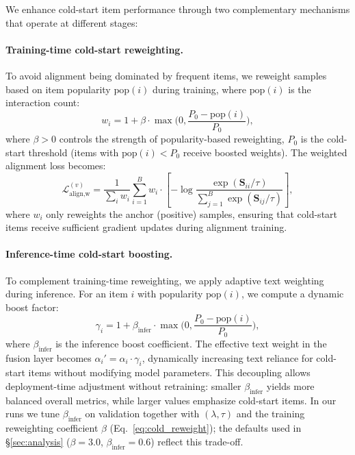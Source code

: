 \documentclass[sigconf,natbib=true,anonymous]{acmart}
\begin{document}
We enhance cold-start item performance through two complementary
mechanisms that operate at different stages:

\paragraph{Training-time cold-start reweighting.}
To avoid alignment being dominated by frequent items, we
reweight samples based on item popularity $\mathrm{pop}(i)$
during training, where $\mathrm{pop}(i)$ is the interaction count:
\begin{equation}
  w_i = 1 + \beta\cdot \max\Big(0, \frac{P_0-\mathrm{pop}(i)}{P_0}\Big),
  \label{eq:cold_reweight}
\end{equation}
where $\beta>0$ controls the strength of popularity-based reweighting,
$P_0$ is the cold-start threshold (items with $\mathrm{pop}(i) < P_0$
receive boosted weights). The weighted alignment loss becomes:
\begin{equation}
  \mathcal{L}_{\text{align,w}}^{(v)} =
  \frac{1}{\sum_i w_i}\sum_{i=1}^{B} w_i \cdot
  \left[-\log \frac{\exp(\mathbf{S}_{ii}/\tau)}{\sum_{j=1}^{B}\exp(\mathbf{S}_{ij}/\tau)}\right],
\end{equation}
where $w_i$ only reweights the anchor (positive) samples, ensuring
that cold-start items receive sufficient gradient updates during
alignment training.

\paragraph{Inference-time cold-start boosting.}
To complement training-time reweighting, we apply adaptive text
weighting during inference. For an item $i$ with popularity
$\mathrm{pop}(i)$, we compute a dynamic boost factor:
\begin{equation}
  \gamma_i = 1 + \beta_{\text{infer}} \cdot \max\Big(0, 
  \frac{P_0-\mathrm{pop}(i)}{P_0}\Big),
  \label{eq:infer_boost}
\end{equation}
where $\beta_{\text{infer}}$ is the inference boost coefficient.
The effective text weight in the fusion layer becomes 
$\alpha_i' = \alpha_i \cdot \gamma_i$, dynamically increasing text
reliance for cold-start items without modifying model parameters.
This decoupling allows deployment-time adjustment without
retraining: smaller $\beta_{\text{infer}}$ yields more balanced
overall metrics, while larger values emphasize cold-start items.
In our runs we tune $\beta_{\text{infer}}$ on validation together
with $(\lambda,\tau)$ and the training reweighting coefficient $\beta$
(Eq.~\eqref{eq:cold_reweight}); the defaults used in
\S\ref{sec:analysis} ($\beta{=}3.0$, $\beta_{\text{infer}}{=}0.6$)
reflect this trade-off.
\end{document}
